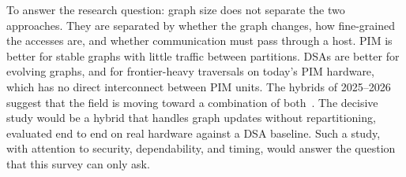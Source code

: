 \documentclass[journal,onecolumn]{IEEEtran}
\begin{document}
To answer the research question: graph size does not separate the two approaches. They are separated by whether the graph changes, how fine-grained the accesses are, and whether communication must pass through a host. PIM is better for stable graphs with little traffic between partitions. DSAs are better for evolving graphs, and for frontier-heavy traversals on today's PIM hardware, which has no direct interconnect between PIM units. The hybrids of 2025--2026 suggest that the field is moving toward a combination of both~\cite{shin2025piccolo,shin2025fala,yenimol2026cograf}. The decisive study would be a hybrid that handles graph updates without repartitioning, evaluated end to end on real hardware against a DSA baseline. Such a study, with attention to security, dependability, and timing, would answer the question that this survey can only ask.





\end{document}
